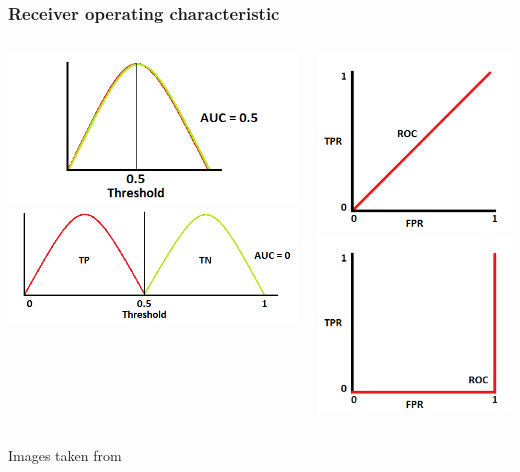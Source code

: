 \documentclass{beamer}
\begin{document}
\begin{frame}
\frametitle{Receiver operating characteristic}
\begin{columns}
\begin{center}
\includegraphics[width=1\linewidth]{Pic/ROC/ROC_C.png}
\includegraphics[width=1\linewidth]{Pic/ROC/ROC_D.png}\\
\end{center}
\begin{center}
\includegraphics[width=0.5\linewidth]{Pic/ROC/ROC_C_R.png}
\includegraphics[width=0.5\linewidth]{Pic/ROC/ROC_D_R.png}\\
\end{center}
\end{columns}
\begin{center}
Images taken from \cite{ROC_fig}
\end{center}
\end{frame}
\end{document}
